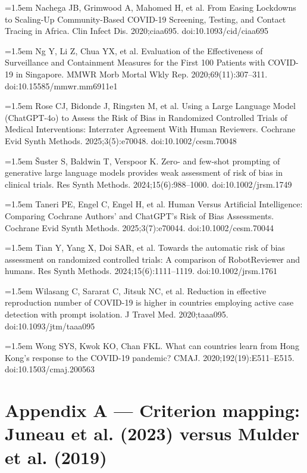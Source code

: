 \documentclass[11pt,a4paper]{article}
\newcommand{\referenceitem}[1]{\noindent\hangafter=1\hangindent=1.5em #1\par\medskip}
\begin{document}
\referenceitem{Nachega JB, Grimwood A, Mahomed H, et al. From Easing Lockdowns to Scaling-Up Community-Based COVID-19 Screening, Testing, and Contact Tracing in Africa. Clin Infect Dis. 2020;ciaa695. doi:10.1093/cid/ciaa695}

\referenceitem{Ng Y, Li Z, Chua YX, et al. Evaluation of the Effectiveness of Surveillance and Containment Measures for the First 100 Patients with COVID-19 in Singapore. MMWR Morb Mortal Wkly Rep. 2020;69(11):307–311. doi:10.15585/mmwr.mm6911e1}

\referenceitem{Rose CJ, Bidonde J, Ringsten M, et al. Using a Large Language Model (ChatGPT-4o) to Assess the Risk of Bias in Randomized Controlled Trials of Medical Interventions: Interrater Agreement With Human Reviewers. Cochrane Evid Synth Methods. 2025;3(5):e70048. doi:10.1002/cesm.70048}

\referenceitem{Šuster S, Baldwin T, Verspoor K. Zero- and few-shot prompting of generative large language models provides weak assessment of risk of bias in clinical trials. Res Synth Methods. 2024;15(6):988–1000. doi:10.1002/jrsm.1749}

\referenceitem{Taneri PE, Engel C, Engel H, et al. Human Versus Artificial Intelligence: Comparing Cochrane Authors' and ChatGPT's Risk of Bias Assessments. Cochrane Evid Synth Methods. 2025;3(7):e70044. doi:10.1002/cesm.70044}

\referenceitem{Tian Y, Yang X, Doi SAR, et al. Towards the automatic risk of bias assessment on randomized controlled trials: A comparison of RobotReviewer and humans. Res Synth Methods. 2024;15(6):1111–1119. doi:10.1002/jrsm.1761}

\referenceitem{Wilasang C, Sararat C, Jitsuk NC, et al. Reduction in effective reproduction number of COVID-19 is higher in countries employing active case detection with prompt isolation. J Travel Med. 2020;taaa095. doi:10.1093/jtm/taaa095}

\referenceitem{Wong SYS, Kwok KO, Chan FKL. What can countries learn from Hong Kong's response to the COVID-19 pandemic? CMAJ. 2020;192(19):E511–E515. doi:10.1503/cmaj.200563}

\appendix

\section{Appendix A — Criterion mapping: Juneau et al. (2023) versus Mulder et al. (2019)}
\end{document}
